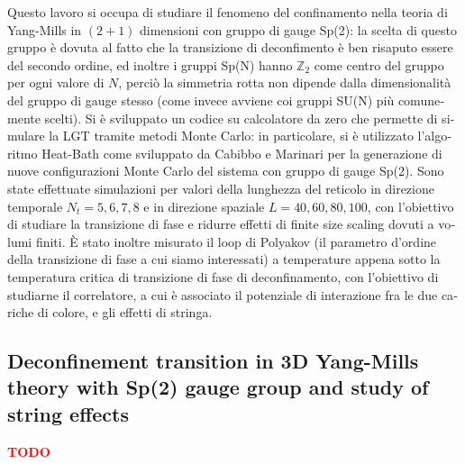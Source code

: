 \documentclass[reqno,11pt]{article}
\numberwithin{equation}{section}
\newcommand{\red}[1]{\textbf{\textcolor{red}{#1}}}
\begin{document}
\begin{otherlanguage}{italian}
Questo lavoro si occupa di studiare il fenomeno del confinamento nella teoria di Yang-Mills in $(2+1)$ dimensioni con 
gruppo di gauge Sp(2): la scelta di questo gruppo è dovuta al fatto che la transizione di deconfimento è ben risaputo
essere del secondo ordine, ed inoltre i gruppi Sp(N) hanno $\mathbb{Z}_2$ come centro del gruppo per ogni valore di $N$, 
perciò la simmetria rotta non dipende dalla dimensionalità del gruppo di gauge stesso (come invece avviene coi gruppi
SU(N) più comunemente scelti). Si è sviluppato un codice su calcolatore da zero che permette di simulare la LGT tramite
metodi Monte Carlo: in particolare, si è utilizzato l'algoritmo Heat-Bath come sviluppato da Cabibbo e Marinari per la 
generazione di nuove configurazioni Monte Carlo del sistema con gruppo di gauge Sp(2). Sono state effettuate simulazioni
per valori della lunghezza del reticolo in direzione temporale $N_t = 5, 6, 7, 8$ e in direzione spaziale 
$L = 40, 60, 80, 100$, con l'obiettivo di studiare la transizione di fase e ridurre effetti di finite size scaling dovuti a volumi finiti. È stato 
inoltre misurato il loop di Polyakov (il parametro d'ordine della transizione di fase a cui siamo interessati) 
a temperature appena sotto la temperatura critica di transizione di fase di deconfinamento, con l'obiettivo 
di studiarne il correlatore, a cui è associato il potenziale di interazione fra le due cariche di colore, e gli effetti
di stringa.

\end{otherlanguage}
\subsection*{Deconfinement transition in 3D Yang-Mills theory with Sp(2) gauge group and study of string effects}

\red{TODO}
\end{document}
